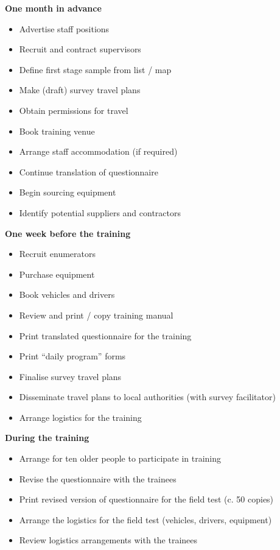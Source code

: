 \documentclass[12pt,a4paper]{book}
\providecommand{\tightlist}{%
  \setlength{\itemsep}{0pt}\setlength{\parskip}{0pt}}
\theoremstyle{definition}
\theoremstyle{definition}
\theoremstyle{definition}
\theoremstyle{remark}
\begin{document}
\textbf{One month in advance}

\begin{itemize}
\tightlist
\item
  Advertise staff positions
\item
  Recruit and contract supervisors
\item
  Define first stage sample from list / map
\item
  Make (draft) survey travel plans
\item
  Obtain permissions for travel
\item
  Book training venue
\item
  Arrange staff accommodation (if required)
\item
  Continue translation of questionnaire
\item
  Begin sourcing equipment
\item
  Identify potential suppliers and contractors
\end{itemize}

\textbf{One week before the training}

\begin{itemize}
\tightlist
\item
  Recruit enumerators
\item
  Purchase equipment
\item
  Book vehicles and drivers
\item
  Review and print / copy training manual
\item
  Print translated questionnaire for the training
\item
  Print ``daily program'' forms
\item
  Finalise survey travel plans
\item
  Disseminate travel plans to local authorities (with survey
  facilitator)
\item
  Arrange logistics for the training
\end{itemize}

\textbf{During the training}

\begin{itemize}
\tightlist
\item
  Arrange for ten older people to participate in training
\item
  Revise the questionnaire with the trainees
\item
  Print revised version of questionnaire for the field test (c. 50
  copies)
\item
  Arrange the logistics for the field test (vehicles, drivers,
  equipment)
\item
  Review logistics arrangements with the trainees
\end{itemize}
\end{document}
